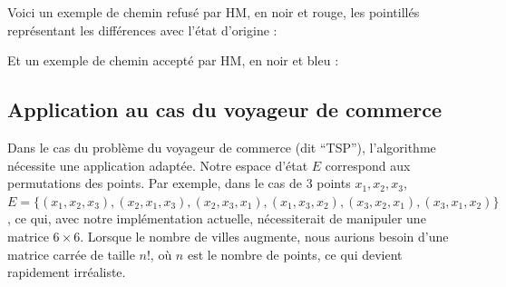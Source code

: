 \documentclass{article}
\begin{document}
Voici un exemple de chemin refusé par HM, en noir et rouge, les pointillés représentant les différences avec l'état d'origine :
\begin{center}
\end{center}

Et un exemple de chemin accepté par HM, en noir et bleu :
\begin{center}
\end{center}

\subsection{Application au cas du voyageur de commerce}

Dans le cas du problème du voyageur de commerce (dit ``TSP''), l'algorithme nécessite une application adaptée.
Notre espace d'état $E$ correspond aux permutations des points. Par exemple, dans le cas de 3 points ${x_1,x_2,x_3}$,
$
E = \{(x_1,x_2,x_3), (x_2,x_1,x_3), (x_2,x_3,x_1), (x_1,x_3,x_2), (x_3,x_2,x_1), (x_3,x_1,x_2)\}
$, 
ce qui, avec notre implémentation actuelle, nécessiterait de manipuler une matrice $6 \times 6$. Lorsque le nombre de villes augmente, nous aurions besoin d'une matrice carrée de taille $n!$, où $n$ est le nombre de points, ce qui devient rapidement irréaliste.
\end{document}

